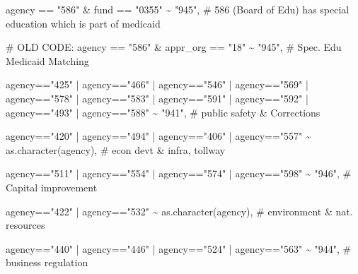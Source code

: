 \documentclass[
  letterpaper,
  DIV=11,
  numbers=noendperiod]{scrreport}
\newenvironment{Shaded}{\begin{snugshade}}{\end{snugshade}}
\newcommand{\CommentTok}[1]{\textcolor[rgb]{0.37,0.37,0.37}{#1}}
\newcommand{\FunctionTok}[1]{\textcolor[rgb]{0.28,0.35,0.67}{#1}}
\newcommand{\NormalTok}[1]{\textcolor[rgb]{0.00,0.23,0.31}{#1}}
\newcommand{\SpecialCharTok}[1]{\textcolor[rgb]{0.37,0.37,0.37}{#1}}
\newcommand{\StringTok}[1]{\textcolor[rgb]{0.13,0.47,0.30}{#1}}
\begin{document}
\begin{Shaded}
\begin{Highlighting}[]
\NormalTok{    agency }\SpecialCharTok{==} \StringTok{"586"} \SpecialCharTok{\&}\NormalTok{ fund }\SpecialCharTok{==} \StringTok{"0355"} \SpecialCharTok{\textasciitilde{}} \StringTok{"945"}\NormalTok{,  }\CommentTok{\# 586 (Board of Edu) has special education which is part of medicaid}
    
    \CommentTok{\# OLD CODE: agency == "586" \& appr\_org == "18" \textasciitilde{} "945", \# Spec. Edu Medicaid Matching}
    
\NormalTok{    agency}\SpecialCharTok{==}\StringTok{"425"} \SpecialCharTok{|}\NormalTok{ agency}\SpecialCharTok{==}\StringTok{"466"} \SpecialCharTok{|}\NormalTok{ agency}\SpecialCharTok{==}\StringTok{"546"} \SpecialCharTok{|}\NormalTok{ agency}\SpecialCharTok{==}\StringTok{"569"} \SpecialCharTok{|}\NormalTok{ agency}\SpecialCharTok{==}\StringTok{"578"} \SpecialCharTok{|}\NormalTok{ agency}\SpecialCharTok{==}\StringTok{"583"} \SpecialCharTok{|}\NormalTok{ agency}\SpecialCharTok{==}\StringTok{"591"} \SpecialCharTok{|}\NormalTok{ agency}\SpecialCharTok{==}\StringTok{"592"} \SpecialCharTok{|}\NormalTok{ agency}\SpecialCharTok{==}\StringTok{"493"} \SpecialCharTok{|}\NormalTok{ agency}\SpecialCharTok{==}\StringTok{"588"} \SpecialCharTok{\textasciitilde{}} \StringTok{"941"}\NormalTok{, }\CommentTok{\# public safety \& Corrections}
    
\NormalTok{    agency}\SpecialCharTok{==}\StringTok{"420"} \SpecialCharTok{|}\NormalTok{ agency}\SpecialCharTok{==}\StringTok{"494"} \SpecialCharTok{|}\NormalTok{  agency}\SpecialCharTok{==}\StringTok{"406"} \SpecialCharTok{|}\NormalTok{ agency}\SpecialCharTok{==}\StringTok{"557"} \SpecialCharTok{\textasciitilde{}} \FunctionTok{as.character}\NormalTok{(agency), }\CommentTok{\# econ devt \& infra, tollway}
    
\NormalTok{    agency}\SpecialCharTok{==}\StringTok{"511"} \SpecialCharTok{|}\NormalTok{ agency}\SpecialCharTok{==}\StringTok{"554"} \SpecialCharTok{|}\NormalTok{ agency}\SpecialCharTok{==}\StringTok{"574"} \SpecialCharTok{|}\NormalTok{ agency}\SpecialCharTok{==}\StringTok{"598"} \SpecialCharTok{\textasciitilde{}} \StringTok{"946"}\NormalTok{,  }\CommentTok{\# Capital improvement}
    
\NormalTok{    agency}\SpecialCharTok{==}\StringTok{"422"} \SpecialCharTok{|}\NormalTok{ agency}\SpecialCharTok{==}\StringTok{"532"} \SpecialCharTok{\textasciitilde{}} \FunctionTok{as.character}\NormalTok{(agency), }\CommentTok{\# environment \& nat. resources}
    
\NormalTok{    agency}\SpecialCharTok{==}\StringTok{"440"} \SpecialCharTok{|}\NormalTok{ agency}\SpecialCharTok{==}\StringTok{"446"} \SpecialCharTok{|}\NormalTok{ agency}\SpecialCharTok{==}\StringTok{"524"} \SpecialCharTok{|}\NormalTok{ agency}\SpecialCharTok{==}\StringTok{"563"}  \SpecialCharTok{\textasciitilde{}} \StringTok{"944"}\NormalTok{, }\CommentTok{\# business regulation}
    

\end{Highlighting}
\end{Shaded}
\end{document}
